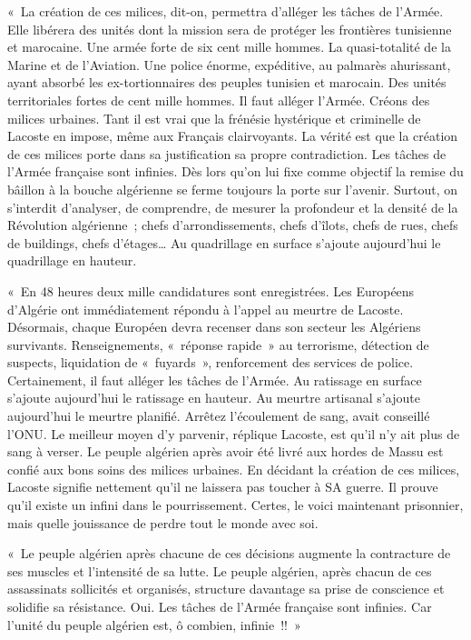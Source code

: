 \documentclass[french,twoside]{book} %
\begin{document}
{ « La création de ces milices, dit-on, permettra d’alléger les tâches de l’Armée. Elle libérera des unités dont la mission sera de protéger les frontières tunisienne et marocaine. Une armée forte de six cent mille hommes. La quasi-totalité de la Marine et de l’Aviation. Une police énorme, expéditive, au palmarès ahurissant, ayant absorbé les ex-tortionnaires des peuples tunisien et marocain. Des unités territoriales fortes de cent mille hommes. Il faut alléger l’Armée. Créons des milices urbaines. Tant il est vrai que la frénésie hystérique et criminelle de Lacoste en impose, même aux Français clairvoyants. La vérité est que la création de ces milices porte dans sa justification sa propre contradiction. Les tâches de l’Armée française sont infinies. Dès lors qu’on lui fixe comme objectif la remise du bâillon à la bouche algérienne se ferme toujours la porte sur l’avenir. Surtout, on s’interdit d’analyser, de comprendre, de mesurer la profondeur et la densité de la Révolution algérienne ; chefs d’arrondissements, chefs d’îlots, chefs de rues, chefs de buildings, chefs d’étages… Au quadrillage en surface s’ajoute aujourd’hui le quadrillage en hauteur.\par
 « En 48 heures deux mille candidatures sont enregistrées. Les Européens d’Algérie ont immédiatement répondu à l’appel au meurtre de Lacoste. Désormais, chaque Européen devra recenser dans son secteur les Algériens survivants. Renseignements, « réponse rapide » au terrorisme, détection de suspects, liquidation de « fuyards », renforcement des services de police. Certainement, il faut alléger les tâches de l’Armée. Au ratissage en surface s’ajoute aujourd’hui le ratissage en hauteur. Au meurtre artisanal s’ajoute aujourd’hui le meurtre planifié. Arrêtez l’écoulement de sang, avait conseillé l’ONU. Le meilleur moyen d’y parvenir, réplique Lacoste, est qu’il n’y ait plus de sang à verser. Le peuple algérien après avoir été livré aux hordes de Massu est confié aux bons soins des milices urbaines. En décidant la création de ces milices, Lacoste signifie nettement qu’il ne laissera pas toucher à SA guerre. Il prouve qu’il existe un infini dans le pourrissement. Certes, le voici maintenant prisonnier, mais quelle jouissance de perdre tout le monde avec soi.\par
 « Le peuple algérien après chacune de ces décisions augmente la contracture de ses muscles et l’intensité de sa lutte. Le peuple algérien, après chacun de ces assassinats sollicités et organisés, structure davantage sa prise de conscience et solidifie sa résistance. Oui. Les tâches de l’Armée française sont infinies. Car l’unité du peuple algérien est, ô combien, infinie !! »
}
\end{document}
